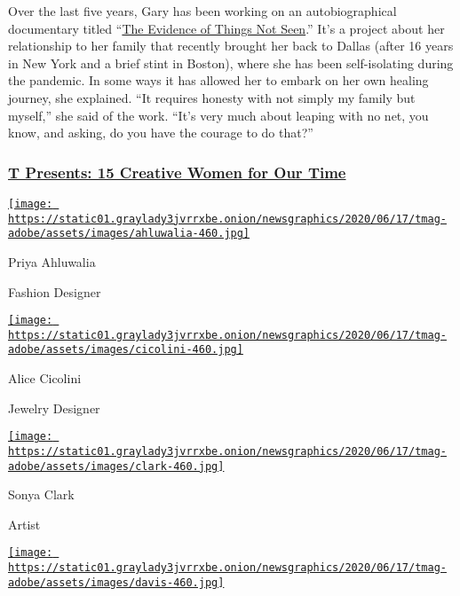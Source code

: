Over the last five years, Gary has been working on an autobiographical
documentary titled
``\href{https://www.jatovia.com/things-not-seen\#1}{The Evidence of
Things Not Seen}.'' It's a project about her relationship to her family
that recently brought her back to Dallas (after 16 years in New York and
a brief stint in Boston), where she has been self-isolating during the
pandemic. In some ways it has allowed her to embark on her own healing
journey, she explained. ``It requires honesty with not simply my family
but myself,'' she said of the work. ``It's very much about leaping with
no net, you know, and asking, do you have the courage to do that?''

\hypertarget{t-presents-15-creative-women-for-our-time}{%
\subsubsection{\texorpdfstring{\href{https://www.nytimes3xbfgragh.onion/interactive/2020/08/10/t-magazine/creative-women-designers-artists-chefs.html}{T
Presents: 15 Creative Women for Our
Time}}{T Presents: 15 Creative Women for Our Time}}\label{t-presents-15-creative-women-for-our-time}}

\href{https://www.nytimes3xbfgragh.onion/section/t-magazine}{}

\href{https://www.nytimes3xbfgragh.onion/2020/08/10/t-magazine/priya-ahluwalia-fashion-menswear.html}{\texttt{[image: https://static01.graylady3jvrrxbe.onion/newsgraphics/2020/06/17/tmag-adobe/assets/images/ahluwalia-460.jpg]}}

Priya Ahluwalia

Fashion Designer

\href{https://www.nytimes3xbfgragh.onion/2020/08/10/t-magazine/alice-cicolini-jewelry-art.html}{\texttt{[image: https://static01.graylady3jvrrxbe.onion/newsgraphics/2020/06/17/tmag-adobe/assets/images/cicolini-460.jpg]}}

Alice Cicolini

Jewelry Designer

\href{https://nytimes3xbfgragh.onion/2020/08/10/t-magazine/sonya-clark-flags-art.html}{\texttt{[image: https://static01.graylady3jvrrxbe.onion/newsgraphics/2020/06/17/tmag-adobe/assets/images/clark-460.jpg]}}

Sonya Clark

Artist

\href{https://www.nytimes3xbfgragh.onion/2020/08/10/t-magazine/pierre-davis-no-sesso.html}{\texttt{[image: https://static01.graylady3jvrrxbe.onion/newsgraphics/2020/06/17/tmag-adobe/assets/images/davis-460.jpg]}}

